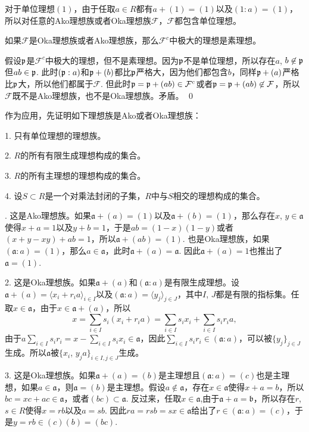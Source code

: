 对于单位理想$(1)$，由于任取$a\in R$都有$a+(1)=(1)$以及$(1:a)=(1)$，所以对任意的Ako理想族或者Oka理想族$\mathcal{F}$，$\mathcal{F}$都包含单位理想。

\pro 如果$\mathcal{F}$是Oka理想族或者Ako理想族，那么$\mathcal{F}^c$中极大的理想是素理想。

\proof
	假设$\mathfrak{p}$是$\mathcal{F}^c$中极大的理想，但不是素理想。因为$\mathfrak{p}$不是单位理想，所以存在$a$, $b\not\in \mathfrak{p}$但$ab\in\mathfrak{p}$. 此时$(\mathfrak{p}:a)$和$\mathfrak{p}+(b)$都比$\mathfrak{p}$严格大，因为他们都包含$b$，同样$\mathfrak{p}+(a)$严格比$\mathfrak{p}$大，所以他们都属于$\mathcal{F}$. 但此时$\mathfrak{p}=\mathfrak{p}+(ab)\in \mathcal{F}^c$或者$\mathfrak{p}=\mathfrak{p}+(ab)\not\in \mathcal{F}$，所以$\mathcal{F}$既不是Ako理想族，也不是Oka理想族。矛盾。
\qed

作为应用，先证明如下理想族是Ako或者Oka理想族：

1. 只有单位理想的理想族。

2. $R$的所有有限生成理想构成的集合。

3. $R$的所有主理想的理想构成的集合。

4. 设$S\subset R$是一个对乘法封闭的子集，$R$中与$S$相交的理想构成的集合。

. 这是Ako理想族。如果$\mathfrak{a}+(a)=(1)$以及$\mathfrak{a}+(b)=(1)$，那么存在$x$, $y\in \mathfrak{a}$使得$x+a=1$以及$y+b=1$，于是$ab=(1-x)(1-y)$或者$(x+y-xy)+ab=1$，所以$\mathfrak{a}+(ab)=(1)$. 也是Oka理想族，如果$(\mathfrak{a}:a)=(1)$，那么$a\in \mathfrak{a}$，此时$\mathfrak{a}+(a)=\mathfrak{a}$. 因此$\mathfrak{a}+(a)=1$也推出了$\mathfrak{a}=(1)$.

	2. 这是Oka理想族。如果$\mathfrak{a}+(a)$和$(\mathfrak{a}:a)$是有限生成理想。设$\mathfrak{a}+(a)=\langle x_i+r_ia \rangle_{i\in I}$以及$(\mathfrak{a}:a)=\langle y_j\rangle_{j\in J}$，其中$I$, $J$都是有限的指标集。任取$x\in \mathfrak{a}$，由于$x\in \mathfrak{a}+(a)$，所以
	\[
		x= \sum_{i\in I}s_i(x_i+r_ia)=\sum_{i\in I}s_ix_i+\sum_{i\in I}s_ir_ia,
	\]
	由于$a\sum_{i\in I}s_ir_i=x-\sum_{i\in I}s_ix_i\in \mathfrak{a}$，因此$\sum_{i\in I}s_ir_i\in (\mathfrak{a}:a)$，可以被$\{y_j\}_{j\in J}$生成。所以$\mathfrak{a}$被$\{x_i$, $y_ja\}_{i\in I,j\in J}$生成。

	3. 这是Oka理想族。如果$\mathfrak{a}+(a)=(b)$是主理想且$(\mathfrak{a}:a)=(c)$也是主理想，如果$a\in \mathfrak{a}$，则$\mathfrak{a}=(b)$是主理想。假设$a\not\in\mathfrak{a}$，存在$x\in \mathfrak{a}$使得$x+a=b$，所以$bc=xc+ac\in \mathfrak{a}$，或者$(bc)\subset \mathfrak{a}$. 反过来，任取$x\in \mathfrak{a}$,由于$\mathfrak{a}+a=\mathfrak{b}$，所以存在$r$, $s\in R$使得$x=rb$以及$a=sb$. 因此$ra=rsb=sx\in\mathfrak{a}$给出了$r\in (\mathfrak{a}:a)=(c)$，于是$y=rb\in (c)(b)=(bc)$.


